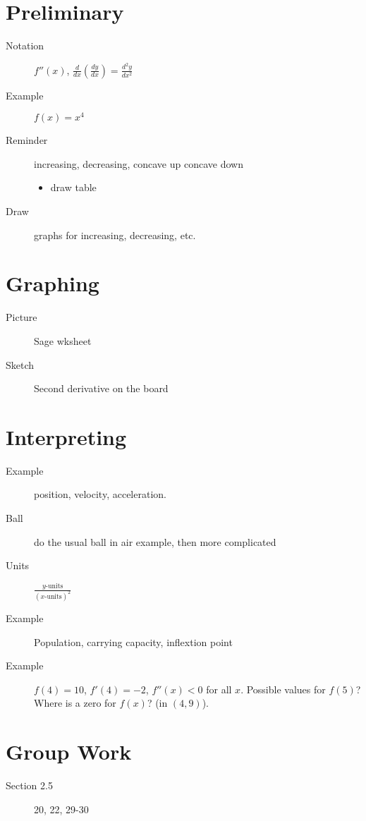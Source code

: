 \documentclass[11pt]{article}
\newcommand{\ds}{\displaystyle}
\begin{document}
\drawtitle

\section*{Preliminary}
\begin{description}
\item[Notation] $f''(x)$,
  $\ds\frac{d}{dx}\left(\frac{dy}{dx}\right)=\frac{d^2y}{dx^2}$
\item[Example] $f(x)=x^4$
\item[Reminder] increasing, decreasing, concave up concave down
  \begin{itemize}
  \item draw table
  \end{itemize}
\item[Draw] graphs for increasing, decreasing, etc.
\end{description}

\section*{Graphing}
\begin{description}
\item[Picture] Sage wksheet
\item[Sketch] Second derivative on the board
\end{description}

\section*{Interpreting}
\begin{description}
\item[Example] position, velocity, acceleration.
\item[Ball] do the usual ball in air example, then more complicated
\item[Units] $\ds\frac{y\mbox{-units}}{\left(x\mbox{-units}\right)^2}$
\item[Example] Population, carrying capacity, inflextion point
\item[Example] $f(4) = 10$, $f'(4) = -2$, $f''(x) < 0$ for all $x$.
  Possible values for $f(5)$? Where is a zero for $f(x)$? (in
  $(4,9)$).
\end{description}

\section*{Group Work}
\begin{description}
\item[Section 2.5] 20, 22, 29-30
\end{description}
\end{document}
